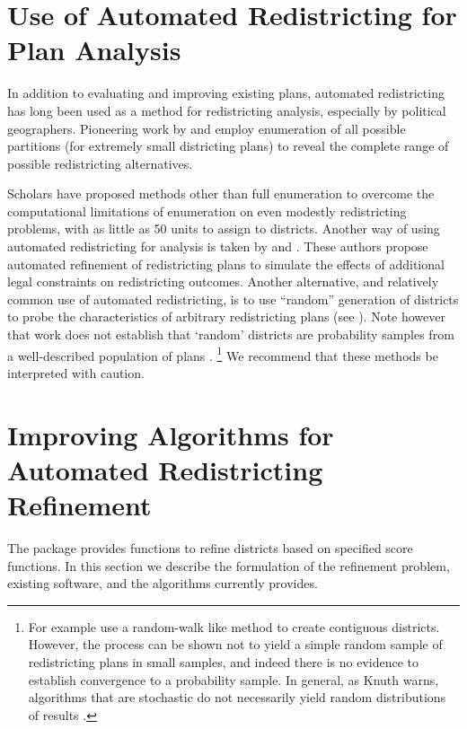 \documentclass[article]{JSSstyle/jss}
\begin{document}
\section{Use of Automated Redistricting for Plan Analysis}

In addition to evaluating and improving existing plans, automated redistricting 
has long been used as a method for redistricting analysis, especially by political geographers.  Pioneering work by 
\citet{ShepJen70} and \citet{GudgTayl79} employ enumeration of all 
possible partitions (for extremely small districting plans) to reveal the complete range of possible redistricting alternatives.  

Scholars have proposed methods other than full enumeration to overcome the computational limitations of enumeration on even modestly 
redistricting problems, with as little as 50 units to assign to districts.  Another way of using automated redistricting for analysis is taken by \citet{Altman97} and \citet{RogersonYang99}. These authors propose 
automated refinement of redistricting plans to simulate the effects of additional legal constraints on redistricting outcomes.  Another alternative, 
and relatively common use of automated redistricting, is to use ``random'' generation of 
districts to probe the characteristics of arbitrary redistricting plans (see \citet{EngWild77,RosJohn81,Oloughlin82,Grofman82,CirDarOro00}). 
Note however that work does not establish that `random' districts are probability samples from a well-described population of plans  \citep{AltmanMcDonald04}. \footnote{For example
\citet[e.g.,]{CirDarOro00} use a random-walk like method to create contiguous districts. However, the process can be shown not to yield a simple random sample of redistricting plans in small samples, and indeed there is no evidence to establish convergence to a probability sample.  In general, as Knuth warns, algorithms that are stochastic do not necessarily yield 
random distributions of results \citep[][]{Knuth97}. 
} We recommend that these methods be interpreted with caution.


\section{Improving Algorithms for Automated Redistricting Refinement} 

The  package provides functions to refine districts based on specified score functions. In this section we describe the formulation of the refinement problem, existing software, and the algorithms  currently provides.  
\end{document}

